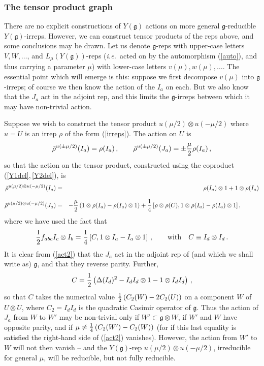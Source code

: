 \documentclass[12pt]{article}
\newcommand{\gf}{\mathfrak{g}}
\begin{document}
\subsubsection{The tensor product graph}\label{TPG}

There are no explicit constructions of $Y(\gf)$ actions on more
general $\gf$-reducible $Y(\gf)$-irreps. However, we can construct
tensor products of the reps above, and some conclusions may be
drawn. Let us denote $\gf$-reps with upper-case letters
$V,W,\ldots$, and $L_\mu\left(Y(\gf)\right)$-reps ({\em i.e.\
}acted on by the automorphism (\ref{auto}), and thus carrying a
parameter $\mu$) with lower-case letters $v(\mu),w(\mu),\ldots$.
The essential point which will emerge is this: suppose we first
decompose $v(\mu)$ into $\gf$-irreps; of course we then know the
action of the $I_a$ on each. But we also know that the $J_a$ act
in the adjoint rep, and this limits the $\gf$-irreps between which
it may have non-trivial action.

Suppose we wish to construct the tensor product $u(\mu/2)\otimes
u(-\mu/2)$ where $u=U$ is an irrep $\rho$ of the form
(\ref{irreps}). The action on $U$ is \begin{equation}\label{irreps2}
\tilde\rho^{u(\pm \mu/2)}(I_a) = \rho(I_a) \,, \qquad
\tilde\rho^{u(\pm \mu/2)}(J_a) = \pm {\mu\over 2}\rho(I_a) \,, \end{equation}
 so that the action on the tensor product,
constructed using the coproduct (\ref{Y1del},\,\ref{Y2del}), is
\begin{eqnarray} \tilde\rho^{u(\mu/2)\otimes u(-\mu/2)}(I_a) & = &\quad
\rho(I_a)\otimes 1
+ 1 \otimes \rho(I_a)\label{act1}\\[0.1in]
\tilde\rho^{u(\mu/2)\otimes u(-\mu/2)}(J_a) & = & -{\mu\over
2}\left(
 1 \otimes \rho(I_a) - \rho(I_a)\otimes 1\right) + {1\over 4}
\left[\rho\otimes\rho(C),1\otimes \rho(I_a) - \rho(I_a)\otimes
1\right],\qquad\quad\label{act2}\end{eqnarray} where we have used the fact
that \begin{equation} {1\over 2} f_{abc} I_c\otimes I_b = {1\over 4} \left[ C,
1\otimes I_a-I_a\otimes 1\right]\,,\qquad {\rm with} \quad C\equiv
I_d\otimes I_d\,.\end{equation} It is clear from (\ref{act2}) that the $J_a$
act in the adjoint rep of (and which we shall write as) $\gf$, and
that they reverse parity. Further, \begin{equation} C={1\over 2}
\left(\Delta(I_d)^2 - I_d I_d\otimes 1 - 1 \otimes I_d
I_d\right)\,,\end{equation} so that $C$ takes the numerical value ${1\over
2}\left(C_2(W)-2C_2(U)\right)$ on a component $W$ of $U\otimes U$,
where $C_2=I_dI_d$ is the quadratic Casimir operator of $\gf$. Thus
the action of $J_a$ from $W$ to $W'$ may be non-trivial only if
$W'\subset \gf\otimes W$, if $W'$ and $W$ have opposite parity, and
if $\mu\neq {1\over 4} \left(C_2(W')-C_2(W)\right)$ (for if this
last equality is satisfied the right-hand side of (\ref{act2})
vanishes). However, the action from $W'$ to $W$ will not then
vanish -- and the $Y(\gf)$-rep $u(\mu/2)\otimes u(-\mu/2)$,
irreducible for general $\mu$, will be reducible, but not fully
reducible.
\end{document}
